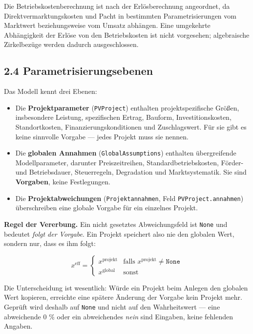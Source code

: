 \documentclass[
  a4paper,
  10pt]{article}
\providecommand{\tightlist}{%
  \setlength{\itemsep}{0pt}\setlength{\parskip}{0pt}}
\begin{document}
Die Betriebskostenberechnung ist nach der Erlösberechnung angeordnet, da
Direktvermarktungskosten und Pacht in bestimmten Parametrisierungen vom
Marktwert beziehungsweise vom Umsatz abhängen. Eine umgekehrte
Abhängigkeit der Erlöse von den Betriebskosten ist nicht vorgesehen;
algebraische Zirkelbezüge werden dadurch ausgeschlossen.

\hypertarget{parametrisierungsebenen}{%
\subsection{2.4 Parametrisierungsebenen}\label{parametrisierungsebenen}}

Das Modell kennt drei Ebenen:

\begin{itemize}
\tightlist
\item
  Die \textbf{Projektparameter} (\texttt{PVProject}) enthalten
  projektspezifische Größen, insbesondere Leistung, spezifischen Ertrag,
  Bauform, Investitionskosten, Standortkosten, Finanzierungskonditionen
  und Zuschlagswert. Für sie gibt es keine sinnvolle Vorgabe --- jedes
  Projekt muss sie nennen.
\item
  Die \textbf{globalen Annahmen} (\texttt{GlobalAssumptions}) enthalten
  übergreifende Modellparameter, darunter Preiszeitreihen,
  Standardbetriebskosten, Förder- und Betriebsdauer, Steuerregeln,
  Degradation und Marktsystematik. Sie sind \textbf{Vorgaben}, keine
  Festlegungen.
\item
  Die \textbf{Projektabweichungen} (\texttt{Projektannahmen}, Feld
  \texttt{PVProject.annahmen}) überschreiben eine globale Vorgabe für
  ein einzelnes Projekt.
\end{itemize}

\textbf{Regel der Vererbung.} Ein nicht gesetztes Abweichungsfeld ist
\texttt{None} und bedeutet \emph{folgt der Vorgabe}. Ein Projekt
speichert also nie den globalen Wert, sondern nur, dass es ihm folgt:

\[ x^{\mathrm{eff}} = \begin{cases}
x^{\mathrm{projekt}} & \text{falls } x^{\mathrm{projekt}} \neq \texttt{None} \\
x^{\mathrm{global}} & \text{sonst}
\end{cases} \]

Die Unterscheidung ist wesentlich: Würde ein Projekt beim Anlegen den
globalen Wert kopieren, erreichte eine spätere Änderung der Vorgabe kein
Projekt mehr. Geprüft wird deshalb auf \texttt{None} und nicht auf den
Wahrheitswert --- eine abweichende 0 \% oder ein abweichendes
\emph{nein} sind Eingaben, keine fehlenden Angaben.
\end{document}
